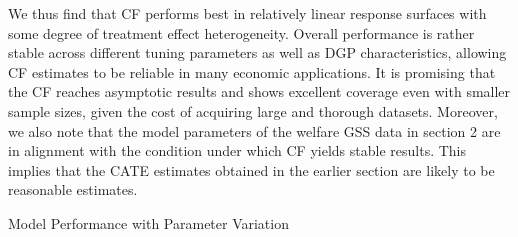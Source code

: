 \documentclass[12pt]{article}
\begin{document}
We thus find that CF performs best in relatively linear response surfaces with some degree of treatment effect heterogeneity. Overall performance is rather stable across different tuning parameters as well as DGP characteristics, allowing CF estimates to be reliable in many economic applications. It is promising that the CF reaches asymptotic results and shows excellent coverage even with smaller sample sizes, given the cost of acquiring large and thorough datasets. Moreover, we also note that the model parameters of the welfare GSS data in section 2 are in alignment with the condition under which CF yields stable results. This implies that the CATE estimates obtained in the earlier section are likely to be reasonable estimates. 

\begin{table}
\caption{Model Performance with Parameter Variation}
\centering
\vspace{0.5cm}
\begin{subtable}{\textwidth}
\caption{Sample Size} 
\end{subtable}


\end{table}
\end{document}
